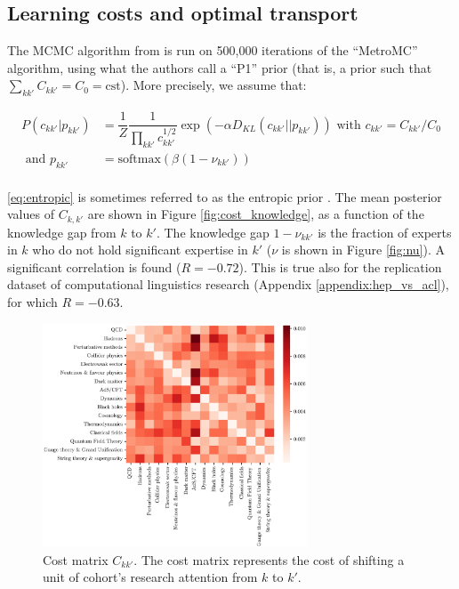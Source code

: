 \documentclass{article}
\begin{document}


\subsection{\label{appendix:optimal_transport}Learning costs and optimal transport}

The MCMC algorithm from \citealt{pmlr-v162-chiu22b} is run on 500,000 iterations of the ``MetroMC'' algorithm, using what the authors call a ``P1'' prior (that is, a prior such that $\sum_{kk'}C_{kk'}=C_0=\mathrm{cst}$). More precisely, we assume that:

\begin{align}
    P(c_{kk'}|p_{kk'}) &= \dfrac{1}{Z}\dfrac{1}{\displaystyle\prod_{kk'} c_{kk'}^{1/2}} \exp{\left(-\alpha D_{KL}(c_{kk'}||p_{kk'})\right)} \text{ with } c_{kk'} = C_{kk'}/C_0\label{eq:entropic}\\
    \text{ and } p_{kk'} &= \mathrm{softmax}(\beta (1-\nu_{kk'}))\\
\end{align}

\eqref{eq:entropic} is sometimes referred to as the entropic prior \citep{skilling1991bayesian,MacKay1995}. The mean posterior values of $C_{k,k'}$ are shown in Figure \ref{fig:cost_knowledge}, as a function of the knowledge gap from $k$ to $k'$. The knowledge gap  $1-\nu_{kk'}$ is the fraction of experts in $k$ who do not hold significant expertise in $k'$ ($\nu$ is shown in Figure \ref{fig:nu}).  A significant correlation is found ($R=-0.72$). This is true also for the replication dataset of computational linguistics research (Appendix \ref{appendix:hep_vs_acl}), for which $R=-0.63$.

\begin{figure}[H]
    \centering
    \includegraphics[width=0.7\textwidth]{plots/Fig13.eps}
    \caption{Cost matrix $C_{kk'}$. The cost matrix represents the cost of shifting a unit of cohort's research attention from $k$ to $k'$.}
    \label{fig:cost_matrix}
\end{figure}
\end{document}
